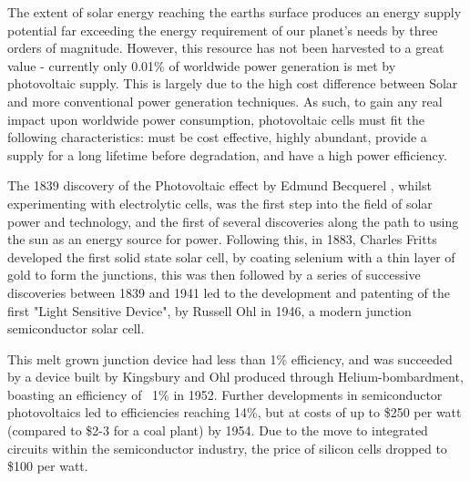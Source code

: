 %
%
%
%
%

The extent of solar energy reaching the earths surface produces an energy supply potential far exceeding the energy requirement of our planet's needs by three orders of magnitude. \citep{morton_solar_2006} However, this resource has not been harvested to a great value - currently only 0.01\% of worldwide power generation is met by photovoltaic supply. \citep{mitzi_path_2011} This is largely due to the high cost difference between Solar and more conventional power generation techniques. As such, to gain any real impact upon worldwide power consumption, photovoltaic cells must fit the following characteristics: must be cost effective, highly abundant, provide a supply for a long lifetime before degradation, and have a high power efficiency.

The 1839 discovery of the Photovoltaic effect by Edmund Becquerel \citep{_photovoltaics_????}, whilst experimenting with electrolytic cells, was the first step into the field of solar power and technology, and the first of several discoveries along the path to using the sun as an energy source for power. Following this, in 1883, Charles Fritts \citep{fritts_new_1883} developed the first solid state solar cell, by coating selenium with a thin layer of gold to form the junctions, this was then followed by a series of successive discoveries between 1839 and 1941 led to the development and patenting of the first "Light Sensitive Device", by Russell Ohl in 1946, a modern junction semiconductor solar cell. \citep{green_path_2009} 

This melt grown junction device had less than 1\% efficiency, and was succeeded by a device built by Kingsbury and Ohl produced through Helium-bombardment, boasting an efficiency of ~1\% in 1952. \citep{green_path_2009} Further developments in semiconductor photovoltaics led to efficiencies reaching 14\%, but at costs of up to \$250 per watt (compared to \$2-3 for a coal plant) by 1954. Due to the move to integrated circuits within the semiconductor industry, the price of silicon cells dropped to \$100 per watt.

